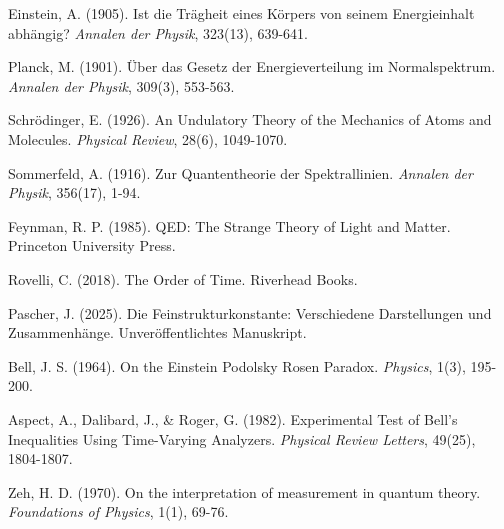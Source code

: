 \documentclass{article}
\begin{document}
	\begin{thebibliography}{9}
		
		 Einstein, A. (1905). Ist die Trägheit eines Körpers von seinem Energieinhalt abhängig? \textit{Annalen der Physik}, 323(13), 639-641.
		
		 Planck, M. (1901). Über das Gesetz der Energieverteilung im Normalspektrum. \textit{Annalen der Physik}, 309(3), 553-563.
		
		 Schrödinger, E. (1926). An Undulatory Theory of the Mechanics of Atoms and Molecules. \textit{Physical Review}, 28(6), 1049-1070.
		
		 Sommerfeld, A. (1916). Zur Quantentheorie der Spektrallinien. \textit{Annalen der Physik}, 356(17), 1-94.
		
		 Feynman, R. P. (1985). QED: The Strange Theory of Light and Matter. Princeton University Press.
		
		 Rovelli, C. (2018). The Order of Time. Riverhead Books.
		
		 Pascher, J. (2025). Die Feinstrukturkonstante: Verschiedene Darstellungen und Zusammenhänge. Unveröffentlichtes Manuskript.
		
		 Bell, J. S. (1964). On the Einstein Podolsky Rosen Paradox. \textit{Physics}, 1(3), 195-200.
		
		 Aspect, A., Dalibard, J., \& Roger, G. (1982). Experimental Test of Bell's Inequalities Using Time-Varying Analyzers. \textit{Physical Review Letters}, 49(25), 1804-1807.
		
		 Zeh, H. D. (1970). On the interpretation of measurement in quantum theory. \textit{Foundations of Physics}, 1(1), 69-76.
		
	\end{thebibliography}
	
\end{document}
